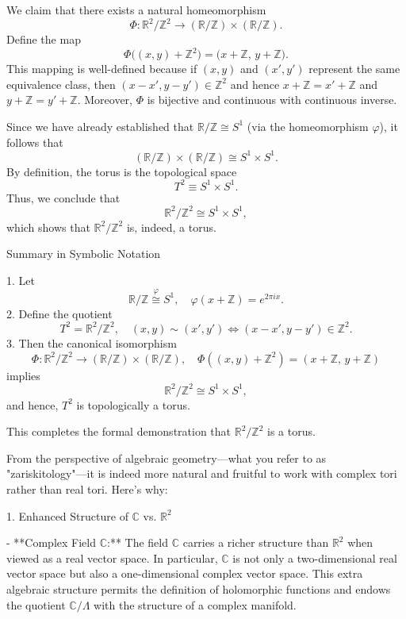 \documentclass[11pt,openany]{article}
\begin{document}
We claim that there exists a natural homeomorphism
\[
\Phi: \mathbb{R}^2/\mathbb{Z}^2 \to (\mathbb{R}/\mathbb{Z}) \times (\mathbb{R}/\mathbb{Z}).
\]
Define the map
\[
\Phi\big((x,y)+\mathbb{Z}^2\big) = \big(x+\mathbb{Z},\, y+\mathbb{Z}\big).
\]
This mapping is well-defined because if \((x,y)\) and \((x',y')\) represent the same equivalence class, then \((x-x',y-y') \in \mathbb{Z}^2\) and hence \(x+\mathbb{Z} = x'+\mathbb{Z}\) and \(y+\mathbb{Z} = y'+\mathbb{Z}\). Moreover, \(\Phi\) is bijective and continuous with continuous inverse. 

Since we have already established that \(\mathbb{R}/\mathbb{Z} \cong S^1\) (via the homeomorphism \(\varphi\)), it follows that
\[
(\mathbb{R}/\mathbb{Z}) \times (\mathbb{R}/\mathbb{Z}) \cong S^1 \times S^1.
\]
By definition, the torus is the topological space
\[
T^2 \equiv S^1 \times S^1.
\]
Thus, we conclude that
\[
\mathbb{R}^2/\mathbb{Z}^2 \cong S^1 \times S^1,
\]
which shows that \(\mathbb{R}^2/\mathbb{Z}^2\) is, indeed, a torus.

Summary in Symbolic Notation

1. Let
\[
\mathbb{R}/\mathbb{Z} \overset{\varphi}{\cong} S^1, \quad \varphi(x+\mathbb{Z}) = e^{2\pi i x}.
\]
2. Define the quotient
\[
T^2 = \mathbb{R}^2/\mathbb{Z}^2, \quad (x,y) \sim (x',y') \iff (x-x',y-y') \in \mathbb{Z}^2.
\]
3. Then the canonical isomorphism
\[
\Phi: \mathbb{R}^2/\mathbb{Z}^2 \to (\mathbb{R}/\mathbb{Z}) \times (\mathbb{R}/\mathbb{Z}),\quad \Phi((x,y)+\mathbb{Z}^2) = (x+\mathbb{Z},\, y+\mathbb{Z})
\]
implies
\[
\mathbb{R}^2/\mathbb{Z}^2 \cong S^1 \times S^1,
\]
and hence, \(T^2\) is topologically a torus.

This completes the formal demonstration that \(\mathbb{R}^2/\mathbb{Z}^2\) is a torus.

\newpage
From the perspective of algebraic geometry—what you refer to as "zariskitology"—it is indeed more natural and fruitful to work with complex tori rather than real tori. Here’s why:

1. Enhanced Structure of \(\mathbb{C}\) vs. \(\mathbb{R}^2\)

- **Complex Field \(\mathbb{C}\):**  
The field \(\mathbb{C}\) carries a richer structure than \(\mathbb{R}^2\) when viewed as a real vector space. In particular, \(\mathbb{C}\) is not only a two-dimensional real vector space but also a one-dimensional complex vector space. This extra algebraic structure permits the definition of holomorphic functions and endows the quotient \(\mathbb{C}/\Lambda\) with the structure of a complex manifold.
\end{document}
